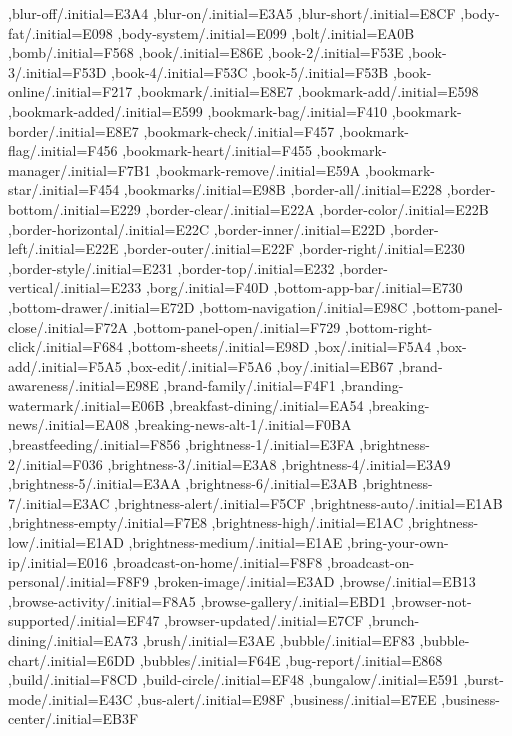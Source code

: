 { ,blur-off/.initial=E3A4
 ,blur-on/.initial=E3A5
 ,blur-short/.initial=E8CF
 ,body-fat/.initial=E098
 ,body-system/.initial=E099
 ,bolt/.initial=EA0B
 ,bomb/.initial=F568
 ,book/.initial=E86E
 ,book-2/.initial=F53E
 ,book-3/.initial=F53D
 ,book-4/.initial=F53C
 ,book-5/.initial=F53B
 ,book-online/.initial=F217
 ,bookmark/.initial=E8E7
 ,bookmark-add/.initial=E598
 ,bookmark-added/.initial=E599
 ,bookmark-bag/.initial=F410
 ,bookmark-border/.initial=E8E7
 ,bookmark-check/.initial=F457
 ,bookmark-flag/.initial=F456
 ,bookmark-heart/.initial=F455
 ,bookmark-manager/.initial=F7B1
 ,bookmark-remove/.initial=E59A
 ,bookmark-star/.initial=F454
 ,bookmarks/.initial=E98B
 ,border-all/.initial=E228
 ,border-bottom/.initial=E229
 ,border-clear/.initial=E22A
 ,border-color/.initial=E22B
 ,border-horizontal/.initial=E22C
 ,border-inner/.initial=E22D
 ,border-left/.initial=E22E
 ,border-outer/.initial=E22F
 ,border-right/.initial=E230
 ,border-style/.initial=E231
 ,border-top/.initial=E232
 ,border-vertical/.initial=E233
 ,borg/.initial=F40D
 ,bottom-app-bar/.initial=E730
 ,bottom-drawer/.initial=E72D
 ,bottom-navigation/.initial=E98C
 ,bottom-panel-close/.initial=F72A
 ,bottom-panel-open/.initial=F729
 ,bottom-right-click/.initial=F684
 ,bottom-sheets/.initial=E98D
 ,box/.initial=F5A4
 ,box-add/.initial=F5A5
 ,box-edit/.initial=F5A6
 ,boy/.initial=EB67
 ,brand-awareness/.initial=E98E
 ,brand-family/.initial=F4F1
 ,branding-watermark/.initial=E06B
 ,breakfast-dining/.initial=EA54
 ,breaking-news/.initial=EA08
 ,breaking-news-alt-1/.initial=F0BA
 ,breastfeeding/.initial=F856
 ,brightness-1/.initial=E3FA
 ,brightness-2/.initial=F036
 ,brightness-3/.initial=E3A8
 ,brightness-4/.initial=E3A9
 ,brightness-5/.initial=E3AA
 ,brightness-6/.initial=E3AB
 ,brightness-7/.initial=E3AC
 ,brightness-alert/.initial=F5CF
 ,brightness-auto/.initial=E1AB
 ,brightness-empty/.initial=F7E8
 ,brightness-high/.initial=E1AC
 ,brightness-low/.initial=E1AD
 ,brightness-medium/.initial=E1AE
 ,bring-your-own-ip/.initial=E016
 ,broadcast-on-home/.initial=F8F8
 ,broadcast-on-personal/.initial=F8F9
 ,broken-image/.initial=E3AD
 ,browse/.initial=EB13
 ,browse-activity/.initial=F8A5
 ,browse-gallery/.initial=EBD1
 ,browser-not-supported/.initial=EF47
 ,browser-updated/.initial=E7CF
 ,brunch-dining/.initial=EA73
 ,brush/.initial=E3AE
 ,bubble/.initial=EF83
 ,bubble-chart/.initial=E6DD
 ,bubbles/.initial=F64E
 ,bug-report/.initial=E868
 ,build/.initial=F8CD
 ,build-circle/.initial=EF48
 ,bungalow/.initial=E591
 ,burst-mode/.initial=E43C
 ,bus-alert/.initial=E98F
 ,business/.initial=E7EE
 ,business-center/.initial=EB3F
}
